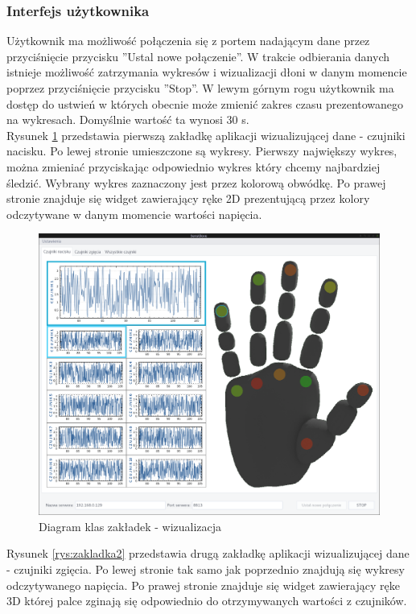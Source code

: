 \documentclass{article}
\begin{document}
\subsubsection{Interfejs użytkownika}
Użytkownik ma możliwość połączenia się z portem nadającym dane przez przyciśnięcie przycisku ''Ustal nowe połączenie''. W trakcie odbierania danych istnieje możliwość zatrzymania wykresów i wizualizacji dłoni w danym momencie poprzez przyciśnięcie przycisku ''Stop''. W lewym górnym rogu użytkownik ma dostęp do ustwień w których obecnie może zmienić zakres czasu prezentowanego na wykresach. Domyślnie wartość ta wynosi 30 s.\\
Rysunek \ref{rys:zakladka1} przedstawia pierwszą zakładkę aplikacji wizualizującej dane - czujniki nacisku. Po lewej stronie umieszczone są wykresy. Pierwszy największy wykres, można zmieniać przyciskając odpowiednio wykres który chcemy najbardziej śledzić. Wybrany wykres zaznaczony jest przez kolorową obwódkę. Po prawej stronie znajduje się widget zawierający ręke 2D prezentującą przez kolory odczytywane w danym momencie wartości napięcia.
\begin{figure}[H]
    \centering
    \includegraphics[width=18cm]{zakladka1.png}
    \caption{Diagram klas zakładek - wizualizacja}
    \label{rys:zakladka1}
\end{figure}
Rysunek \ref{rys:zakladka2} przedstawia drugą zakładkę aplikacji wizualizującej dane - czujniki zgięcia. Po lewej stronie tak samo jak poprzednio znajdują się wykresy odczytywanego napięcia. Po prawej stronie znajduje się widget zawierający ręke 3D której palce zginają się odpowiednio do otrzymywanych wartości z czujników.
\end{document}

